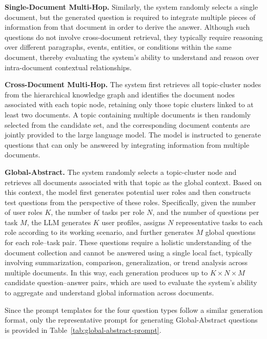 \documentclass[preprint,12pt,authoryear]{elsarticle}
\begin{document}
\textbf{Single-Document Multi-Hop.}
Similarly, the system randomly selects a single document, but the generated question is required to integrate multiple pieces of information from that document in order to derive the answer. Although such questions do not involve cross-document retrieval, they typically require reasoning over different paragraphs, events, entities, or conditions within the same document, thereby evaluating the system's ability to understand and reason over intra-document contextual relationships.

\textbf{Cross-Document Multi-Hop.}
The system first retrieves all topic-cluster nodes from the hierarchical knowledge graph and identifies the document nodes associated with each topic node, retaining only those topic clusters linked to at least two documents. A topic containing multiple documents is then randomly selected from the candidate set, and the corresponding document contents are jointly provided to the large language model. The model is instructed to generate questions that can only be answered by integrating information from multiple documents.

\textbf{Global-Abstract.}
The system randomly selects a topic-cluster node and retrieves all documents associated with that topic as the global context. Based on this context, the model first generates potential user roles and then constructs test questions from the perspective of these roles. Specifically, given the number of user roles $K$, the number of tasks per role $N$, and the number of questions per task $M$, the LLM generates $K$ user profiles, assigns $N$ representative tasks to each role according to its working scenario, and further generates $M$ global questions for each role--task pair. These questions require a holistic understanding of the document collection and cannot be answered using a single local fact, typically involving summarization, comparison, generalization, or trend analysis across multiple documents. In this way, each generation produces up to $K \times N \times M$ candidate question--answer pairs, which are used to evaluate the system's ability to aggregate and understand global information across documents.

Since the prompt templates for the four question types follow a similar generation format, only the representative prompt for generating Global-Abstract questions is provided in Table~\ref{tab:global-abstract-prompt}.



\FloatBarrier
\end{document}
